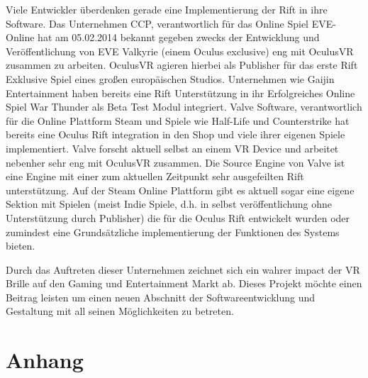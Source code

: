 \documentclass[pagesize, paper=a4, fontsize=12pt,titlepage=true, headings=small, headnosepline, abstractoff, liststotoc, nochapterprefix, plainheadsepline]{scrreprt}
\begin{document}
Viele Entwickler überdenken gerade eine Implementierung der Rift in ihre Software. Das Unternehmen CCP, verantwortlich für das Online Spiel EVE-Online hat am 05.02.2014 bekannt gegeben zwecks der Entwicklung und Veröffentlichung von EVE Valkyrie (einem Oculus exclusive) eng mit OculusVR zusammen zu arbeiten. OculusVR agieren hierbei als Publisher für das erste Rift Exklusive Spiel eines großen europäischen Studios. Unternehmen wie Gaijin Entertainment haben bereits eine Rift Unterstützung in ihr Erfolgreiches Online Spiel War Thunder als Beta Test Modul integriert. Valve Software, verantwortlich für die Online Plattform Steam und Spiele wie Half-Life und Counterstrike hat bereits eine Oculus Rift integration in den Shop und viele ihrer eigenen Spiele implementiert. Valve forscht aktuell selbst an einem VR Device und arbeitet nebenher sehr eng mit OculusVR zusammen. Die Source Engine von Valve ist eine Engine mit einer zum aktuellen Zeitpunkt sehr ausgefeilten Rift unterstützung. Auf der Steam Online Plattform gibt es aktuell sogar eine eigene Sektion mit Spielen (meist Indie Spiele, d.h. in selbst veröffentlichung ohne Unterstützung durch Publisher) die für die Oculus Rift entwickelt wurden oder zumindest eine Grundsätzliche implementierung der Funktionen des Systems bieten.

Durch das Auftreten dieser Unternehmen zeichnet sich ein wahrer impact der VR Brille auf den Gaming und Entertainment Markt ab. Dieses Projekt möchte einen Beitrag leisten um einen neuen Abschnitt der Softwareentwicklung und Gestaltung mit all seinen Möglichkeiten zu betreten.


\part*{Anhang}



\end{document}
